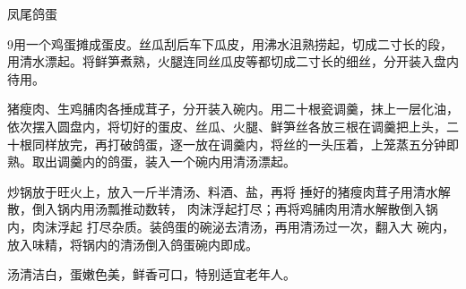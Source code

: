 \begin{recipe}{凤尾鸽蛋}

\ingredients


\cooking

\step 9用一个鸡蛋摊成蛋皮。丝瓜刮后车下瓜皮，用沸水沮熟捞起，切成二寸长的段，用清水漂起。将鲜笋煮熟，火腿连同丝瓜皮等都切成二寸长的细丝，分开装入盘内待用。

\step 猪瘦肉、生鸡脯肉各捶成茸子，分开装入碗内。用二十根瓷调羹，抹上一层化油，依次摆入圆盘内，将切好的蛋皮、丝瓜、火腿、鲜笋丝各放三根在调羹把上头，二十根同样放完，再打破鸽蛋，逐一放在调羹内，将丝的一头压着，上笼蒸五分钟即熟。取出调羹内的鸽蛋，装入一个碗内用清汤漂起。

炒锅放于旺火上，放入一斤半清汤、料酒、盐，再将 捶好的猪瘦肉茸子用清水解散，倒入锅内用汤瓢推动数转， 肉沫浮起打尽；再将鸡脯肉用清水解散倒入锅内，肉沫浮起 打尽杂质。装鸽蛋的碗泌去清汤，再用清汤过一次，翻入大 碗内，放入味精，将锅内的清汤倒入鸽蛋碗内即成。

\notes

汤清洁白，蛋嫩色美，鲜香可口，特别适宜老年人。

\end{recipe}

